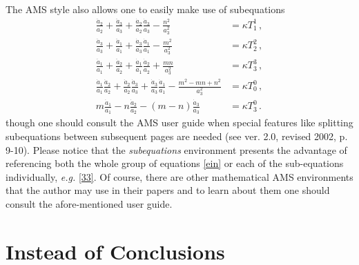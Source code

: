 \documentclass[myclassdoc,debug]{rjparticle}
\begin{document}
The AMS style also allows one to easily make use of subequations
\begin{subequations}
\label{ein}
\begin{align}
\frac{\ddot a_2}{a_2} +\frac{\ddot a_3}{a_3} +\frac{\dot
a_2}{a_2}\frac{\dot
a_3}{a_3} - \frac{n^2}{a_3^2} &= \kappa T_{1}^{1}\,, \label{11}\\
\frac{\ddot a_3}{a_3} +\frac{\ddot a_1}{a_1} +\frac{\dot
a_3}{a_3}\frac{\dot
a_1}{a_1} - \frac{m^2}{a_3^2} &= \kappa T_{2}^{2}\,, \label{22} \\
\frac{\ddot a_1}{a_1} +\frac{\ddot a_2}{a_2} +\frac{\dot
a_1}{a_1}\frac{\dot
a_2}{a_2} + \frac{m n}{a_3^2} &= \kappa T_{3}^{3}\,, \label{33} \\
\frac{\dot a_1}{a_1}\frac{\dot a_2}{a_2} +\frac{\dot a_2}{a_2}
\frac{\dot a_3}{a_3} + \frac{\dot a_3}{a_3}\frac{\dot a_1}{a_1} -
\frac{m^2 - m n + n^2}{a_3^2} &=
\kappa T_{0}^{0}\,, \label{00}\\
m \frac{\dot a_1}{a_1} - n \frac{\dot a_2}{a_2} - (m - n) \frac{\dot
a_3}{a_3} &= \kappa T_{3}^{0}\,. \label{03}
\end{align}
\end{subequations}
though one should consult the AMS user guide \cite{amsug} when special features like splitting subequations between subsequent pages are needed (see \cite{amsug} ver. 2.0, revised 2002, p. 9-10). Please notice that the \textit{subequations} environment presents the advantage of referencing both the whole group of equations \eqref{ein} or each of the sub-equations individually, \textit{e.g.} \eqref{33}. Of course, there are other mathematical AMS environments that the author may use in their papers and to learn about them one should consult the afore-mentioned user guide.

\section{Instead of Conclusions}
\end{document}
